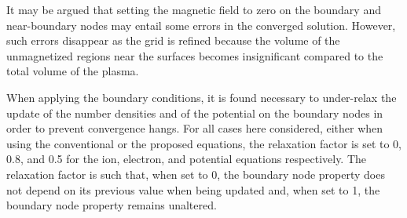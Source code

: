 \documentclass{warpdoc}
\begin{document}
It may be argued that setting the magnetic field to zero on the boundary and near-boundary nodes may entail some errors in the converged solution. However, such errors disappear as the grid is refined because the volume of the unmagnetized regions near the surfaces becomes insignificant compared to the total volume of the plasma.

When applying the boundary conditions, it is found necessary to under-relax the update of the number densities and of the potential on the boundary nodes in order to prevent convergence hangs. For all cases here considered, either when using the conventional or the proposed equations, the relaxation factor is set to 0, 0.8, and 0.5 for the ion, electron, and potential equations respectively. The relaxation factor is such that, when set to 0, the boundary node property does not depend on its previous value when being updated and, when set to 1, the boundary node property remains unaltered. 





  
  
\end{document}
